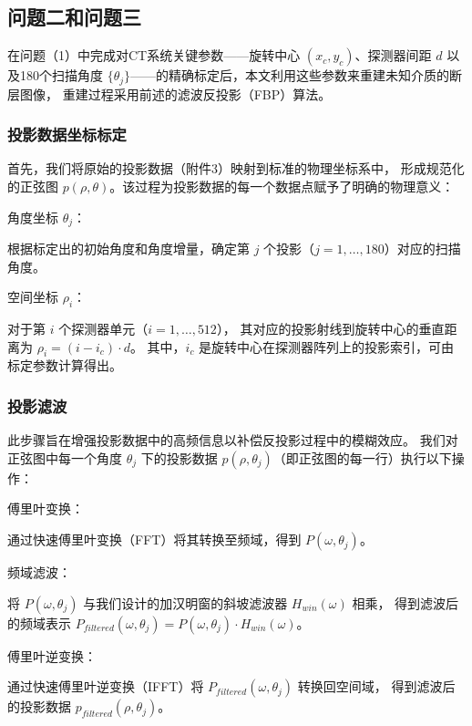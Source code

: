 \subsection{问题二和问题三}
在问题（1）中完成对CT系统关键参数——旋转中心 $(x_c, y_c)$、探测器间距 $d$ 
以及180个扫描角度 $\{\theta_j\}$——的精确标定后，本文利用这些参数来重建未知介质的断层图像，
重建过程采用前述的滤波反投影（FBP）算法。

\subsubsection{投影数据坐标标定}
首先，我们将原始的投影数据（附件3）映射到标准的物理坐标系中，
形成规范化的正弦图 $p(\rho, \theta)$。该过程为投影数据的每一个数据点赋予了明确的物理意义：\par
角度坐标 $\theta_j$：\par
根据标定出的初始角度和角度增量，确定第 $j$ 个投影（$j=1, \dots, 180$）对应的扫描角度。\par
空间坐标 $\rho_i$：\par
对于第 $i$ 个探测器单元（$i=1, \dots, 512$），
其对应的投影射线到旋转中心的垂直距离为 $\rho_i = (i - i_c) \cdot d$。
其中，$i_c$ 是旋转中心在探测器阵列上的投影索引，可由标定参数计算得出。\par

\subsubsection{投影滤波}
此步骤旨在增强投影数据中的高频信息以补偿反投影过程中的模糊效应。
我们对正弦图中每一个角度 $\theta_j$ 下的投影数据 $p(\rho, \theta_j)$（即正弦图的每一行）执行以下操作：\par
傅里叶变换：\par
通过快速傅里叶变换（FFT）将其转换至频域，得到 $P(\omega, \theta_j)$。\par
频域滤波：\par
将 $P(\omega, \theta_j)$ 与我们设计的加汉明窗的斜坡滤波器 $H_{win}(\omega)$ 相乘，
得到滤波后的频域表示 $P_{filtered}(\omega, \theta_j) = P(\omega, \theta_j) \cdot H_{win}(\omega)$。\par
傅里叶逆变换：\par
通过快速傅里叶逆变换（IFFT）将 $P_{filtered}(\omega, \theta_j)$ 转换回空间域，
得到滤波后的投影数据 $p_{filtered}(\rho, \theta_j)$。\par

